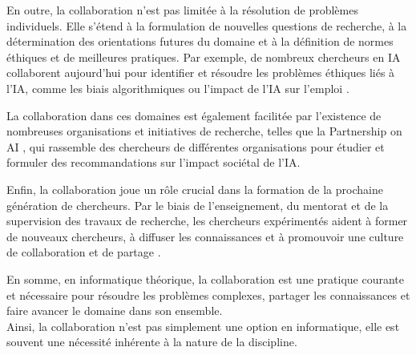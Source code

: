 En outre, la collaboration n'est pas limitée à la résolution de problèmes individuels. Elle s'étend à la formulation de nouvelles questions de recherche, à la détermination des orientations futures du domaine et à la définition de normes éthiques et de meilleures pratiques. Par exemple, de nombreux chercheurs en IA collaborent aujourd'hui pour identifier et résoudre les problèmes éthiques liés à l'IA, comme les biais algorithmiques ou l'impact de l'IA sur l'emploi \cite{jobin_artificial_2019}.

La collaboration dans ces domaines est également facilitée par l'existence de nombreuses organisations et initiatives de recherche, telles que la Partnership on AI \cite{partnership_on_ai}, qui rassemble des chercheurs de différentes organisations pour étudier et formuler des recommandations sur l'impact sociétal de l'IA.

Enfin, la collaboration joue un rôle crucial dans la formation de la prochaine génération de chercheurs. Par le biais de l'enseignement, du mentorat et de la supervision des travaux de recherche, les chercheurs expérimentés aident à former de nouveaux chercheurs, à diffuser les connaissances et à promouvoir une culture de collaboration et de partage \cite{long_cooperation_2008}.

En somme, en informatique théorique, la collaboration est une pratique courante et nécessaire pour résoudre les problèmes complexes, partager les connaissances et faire avancer le domaine dans son ensemble.\\

Ainsi, la collaboration n'est pas simplement une option en informatique, elle est souvent une nécessité inhérente à la nature de la discipline.

